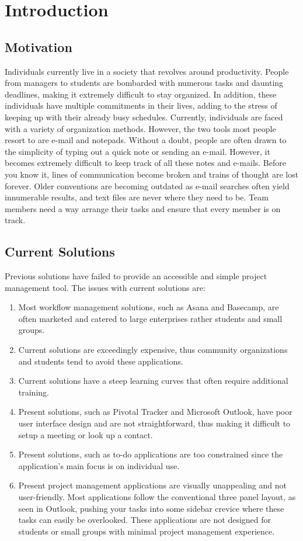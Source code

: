 \chapter{Introduction}

\section{Motivation}

Individuals currently live in a society that revolves around productivity. People from managers to students are bombarded with numerous tasks and daunting deadlines, making it extremely difficult to stay organized. In addition, these individuals have multiple commitments in their lives, adding to the stress of keeping up with their already busy schedules. Currently, individuals are faced with a variety of organization methods. However, the two tools most people resort to are e-mail and notepads. Without a doubt, people are often drawn to the simplicity of typing out a quick note or sending an e-mail. However, it becomes extremely difficult to keep track of all these notes and e-mails. Before you know it, lines of communication become broken and trains of thought are lost forever. Older conventions are becoming outdated as e-mail searches often yield innumerable results, and text files are never where they need to be. Team members need a way arrange their tasks and ensure that every member is on track.

\section{Current Solutions} 

Previous solutions have failed to provide an accessible and simple project management tool. The issues with current solutions are:
\begin{enumerate} 
	\item Most workflow management solutions, such as Asana and Basecamp, are often marketed and catered to large enterprises rather students and small groups. 
	\item Current solutions are exceedingly expensive, thus community organizations and students tend to avoid these applications. 
	\item Current solutions have a steep learning curves that often require additional training. 
	\item Present solutions, such as Pivotal Tracker and Microsoft Outlook, have poor user interface design and are not straightforward, thus making it difficult to setup a meeting or look up a contact. 
	\item Present solutions, such as to-do applications are too constrained since the application's main focus is on individual use. 
	\item Present project management applications are visually unappealing and not user-friendly. Most applications follow the conventional three panel layout, as seen in Outlook, pushing your tasks into some sidebar crevice where these tasks can easily be overlooked. These applications are not designed for students or small groups with minimal project management experience.
\end{enumerate}

